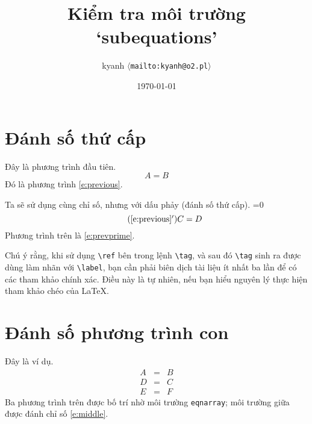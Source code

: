 \documentclass[fleqn]{article}
\title{Kiểm tra môi trường `subequations'}
\author{kyanh $\langle$\texttt{mailto:kyanh@o2.pl}$\rangle$}
\date{\today}
\makeatletter
\numberwithin{equation}{section}
\newcommand{\env}[1]{{\normalfont\texttt{#1}}}
\newcommand{\multipasswarning}{%
  \clearpage
  \typeout{%
  **********************************************************************}
  \typeout{%
  Note: This document needs to run through LaTeX three times, instead of}
  \typeout{%
  the usual two, to resolve indirect cross-references.}
  \typeout{%
  **********************************************************************}
}
\def\checkref{\begingroup
  \@ifundefined{r@check}{\def\@currentlabel{0}}{\def\@currentlabel{1}}%
  \ifnum1=0\expandafter\@firstoftwo\r@check\relax
    \global\let\multipasswarning\relax
  \fi
  \label{check}%
  \endgroup}
\makeatother
\begin{document}
\maketitle

\section{Đánh số thứ cấp}

Đây là phương trình đầu tiên.
\begin{equation}\label{e:previous}
A=B
\end{equation}
Đó là phương trình \eqref{e:previous}.

Ta sẽ sử dụng cùng chỉ số, nhưng với dấu phảy (đánh số thứ cấp).\checkref
\begin{equation}
\tag{\ref{e:previous}$'$}\label{e:prevprime}
C=D
\end{equation}
Phương trình trên là \eqref{e:prevprime}.

\medskip 
Chú ý rằng, khi sử dụng \verb"\ref" bên trong lệnh \verb"\tag",
và sau đó \verb"\tag" sinh ra được dùng làm nhãn với \verb"\label", bạn
cần phải biên dịch tài liệu ít nhất ba lần để có các tham khảo chính xác.
Điều này là tự nhiên, nếu bạn hiểu nguyên lý thực hiện tham khảo chéo của \LaTeX{}.


\section{Đánh số phương trình con}

Đây là ví dụ.
\begin{subequations}
\begin{eqnarray}
A&=&B\\
D&=&C \label{e:middle}\\
E&=&F
\end{eqnarray}
\end{subequations}
Ba phương trình trên được bố trí nhờ môi trường \env{eqnarray};
môi trường giữa được đánh chỉ số \eqref{e:middle}.
\end{document}
